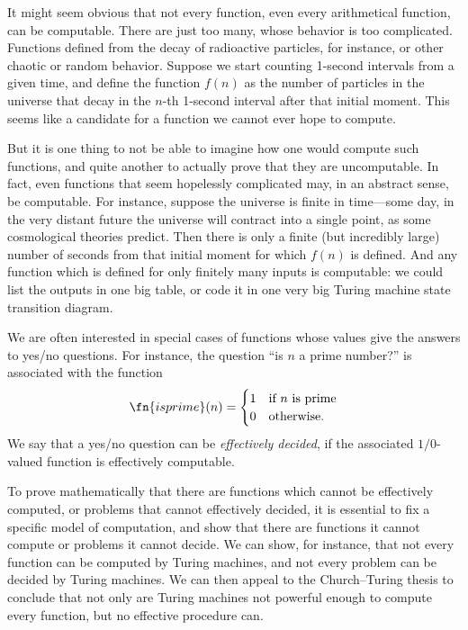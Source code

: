 \documentclass[../../../include/open-logic-section]{subfiles}
\begin{document}

It might seem obvious that not every function, even every arithmetical
function, can be computable. There are just too many, whose behavior
is too complicated.  Functions defined from the decay of radioactive
particles, for instance, or other chaotic or random behavior. Suppose
we start counting 1-second intervals from a given time, and define the
function $f(n)$ as the number of particles in the universe that decay
in the $n$-th 1-second interval after that initial moment.  This seems
like a candidate for a function we cannot ever hope to compute.

But it is one thing to not be able to imagine how one would compute
such functions, and quite another to actually prove that they are
uncomputable.  In fact, even functions that seem hopelessly
complicated may, in an abstract sense, be computable.  For instance,
suppose the universe is finite in time---some day, in the very distant
future the universe will contract into a single point, as some
cosmological theories predict. Then there is only a finite (but
incredibly large) number of seconds from that initial moment for which
$f(n)$ is defined.  And any function which is defined for only finitely
many inputs is computable: we could list the outputs in one big table,
or code it in one very big Turing machine state transition diagram.

We are often interested in special cases of functions whose values give
the answers to yes/no questions.  For instance, the question ``is $n$
a prime number?'' is associated with the function
\[
\fn{isprime}(n) = \begin{cases}
  1 & \text{if $n$ is prime}\\
  0 & \text{otherwise.}
  \end{cases}
\]
We say that a yes/no question can be \emph{effectively decided}, if
the associated $1/0$-valued function is effectively computable.

To prove mathematically that there are functions which cannot be
effectively computed, or problems that cannot effectively decided, it
is essential to fix a specific model of computation, and show
that there are functions it cannot compute or problems it cannot
decide.  We can show, for instance, that not every function can be
computed by Turing machines, and not every problem can be decided by
Turing machines.  We can then appeal to the Church--Turing thesis to
conclude that not only are Turing machines not powerful enough to
compute every function, but no effective procedure can.
\end{document}
